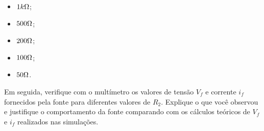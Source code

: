\begin{itemize}
    \item $1 k\ohm$;
    \item $500 \ohm$;
    \item $200 \ohm$;
    \item $100 \ohm$;
    \item $50 \ohm$.
\end{itemize}


Em seguida, verifique com o multímetro os valores de tensão $V_f$ e corrente $i_f$ fornecidos pela fonte para diferentes valores de $R_2$.
Explique o que você observou e justifique o comportamento da fonte comparando com os cálculos teóricos de $V_f$ e $i_f$ realizados
nas simulações.